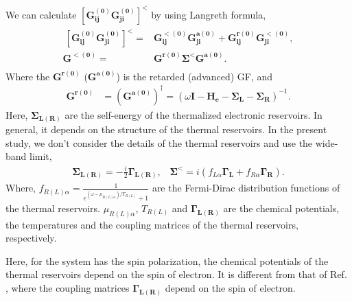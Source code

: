 \documentclass[aps,prb,twocolumn,showpacs,amssymb]{revtex4-1}
\begin{document}
\begin{appendix}
We can calculate $[\bm{G^{(0)}_{ij}}\bm{G^{(0)}_{ji}}]^{<}$ by using Langreth formula,
\begin{eqnarray}
\begin{aligned}
{\ }[\bm{G^{(0)}_{ij}}\bm{G^{(0)}_{ji}}]^{<}=&\bm{G^{<(0)}_{ij}}\bm{G^{a(0)}_{ji}}+\bm{G^{r(0)}_{ij}}\bm{G^{<(0)}_{ji}},\\
\bm{G^{<(0)}}=&\bm{G^{r(0)}}\bm{\Sigma}^<\bm{G^{a(0)}}.\\
\end{aligned}
\end{eqnarray}
Where the $\bm{G^{r(0)}}$ ($\bm{G^{a(0)}}$) is the retarded (advanced) GF, and
\begin{eqnarray}
\bm{G^{r(0)}}&=(\bm{G^{a(0)}})^\dagger=(\omega\bm{I}-\bm{H_e}-\bm{\Sigma_L}-\bm{\Sigma_R})^{-1}.
\end{eqnarray}
Here, $\bm{\Sigma_{L(R)}}$ are the self-energy of the thermalized electronic reservoirs. In general, it depends on the structure of the thermal reservoirs. In the present study, we don't consider the details of the thermal reservoirs and use the wide-band limit,
\begin{eqnarray}
\bm{\Sigma_{L(R)}}=-\frac{i}{2}\bm{\Gamma_{L(R)}}, \;\;\;
\bm{\Sigma^<}=i(f_{L\alpha}\bm{\Gamma_{L}}+f_{R\alpha}\bm{\Gamma_{R}}).
\end{eqnarray}
Where, $f_{R(L)\alpha}=\frac{1}{e^{(\omega-\mu_{R(L)\alpha})/T_{R(L)}}+1}$ are the Fermi-Dirac distribution functions of the thermal reservoirs. $\mu_{R(L)\alpha}$, $T_{R(L)}$ and $\bm{\Gamma_{L(R)}}$ are the chemical potentials, the temperatures and the coupling matrices of the thermal reservoirs, respectively.

Here, for the system has the spin polarization, the chemical potentials of the thermal reservoirs depend on the spin of electron. It is different from that of Ref. \cite{Ren2014}, where the coupling matrices $\bm{\Gamma_{L(R)}}$ depend on the spin of electron.


\end{appendix}
\end{document}
